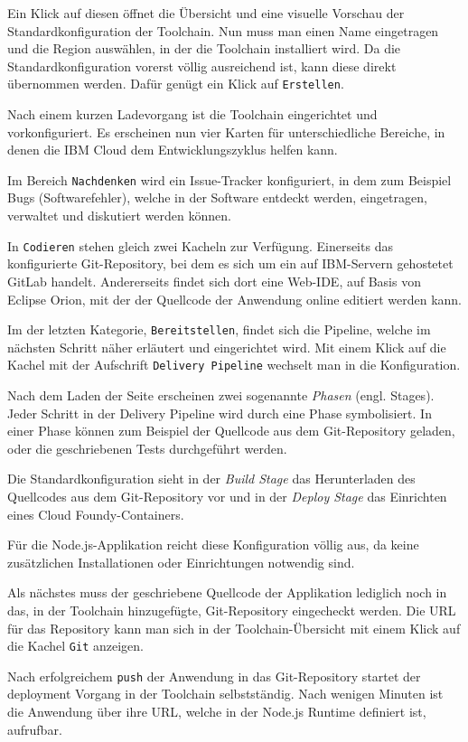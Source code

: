 Ein Klick auf diesen öffnet die Übersicht und eine visuelle Vorschau der Standardkonfiguration der Toolchain. Nun muss
man einen Name eingetragen und die Region auswählen, in der die Toolchain installiert wird. Da die Standardkonfiguration
vorerst völlig ausreichend ist, kann diese direkt übernommen werden. Dafür genügt ein Klick auf \texttt{Erstellen}.

Nach einem kurzen Ladevorgang ist die Toolchain eingerichtet und vorkonfiguriert. Es erscheinen nun vier Karten für
unterschiedliche Bereiche, in denen die IBM Cloud dem Entwicklungszyklus helfen kann.

Im Bereich \texttt{Nachdenken} wird ein Issue-Tracker konfiguriert, in dem zum Beispiel Bugs (Softwarefehler), welche
in der Software entdeckt werden, eingetragen, verwaltet und diskutiert werden können.

In \texttt{Codieren} stehen gleich zwei Kacheln zur Verfügung. Einerseits das konfigurierte Git-Repository, bei dem es
sich um ein auf IBM-Servern gehostetet GitLab handelt. Andererseits findet sich dort eine Web-IDE, auf Basis von Eclipse
Orion, mit der der Quellcode der Anwendung online editiert werden kann.

Im der letzten Kategorie, \texttt{Bereitstellen}, findet sich die Pipeline, welche im nächsten Schritt näher erläutert
und eingerichtet wird. Mit einem Klick auf die Kachel mit der Aufschrift \texttt{Delivery Pipeline} wechselt man in die
Konfiguration.

Nach dem Laden der Seite erscheinen zwei sogenannte \textit{Phasen} (engl. Stages). Jeder Schritt in der Delivery Pipeline
wird durch eine Phase symbolisiert. In einer Phase können zum Beispiel der Quellcode aus dem Git-Repository geladen, oder
die geschriebenen Tests durchgeführt werden.

Die Standardkonfiguration sieht in der \textit{Build Stage} das Herunterladen des Quellcodes aus dem Git-Repository vor
und in der \textit{Deploy Stage} das Einrichten eines Cloud Foundy-Containers.

Für die Node.js-Applikation reicht diese Konfiguration völlig aus, da keine zusätzlichen Installationen oder Einrichtungen
notwendig sind.

Als nächstes muss der geschriebene Quellcode der Applikation lediglich noch in das, in der Toolchain hinzugefügte,
Git-Repository eingecheckt werden. Die URL für das Repository kann man sich in der Toolchain-Übersicht mit einem Klick
auf die Kachel \texttt{Git} anzeigen.

Nach erfolgreichem \texttt{push} der Anwendung in das Git-Repository startet der deployment Vorgang in der Toolchain
selbstständig. Nach wenigen Minuten ist die Anwendung über ihre URL, welche in der Node.js Runtime definiert ist,
aufrufbar.

